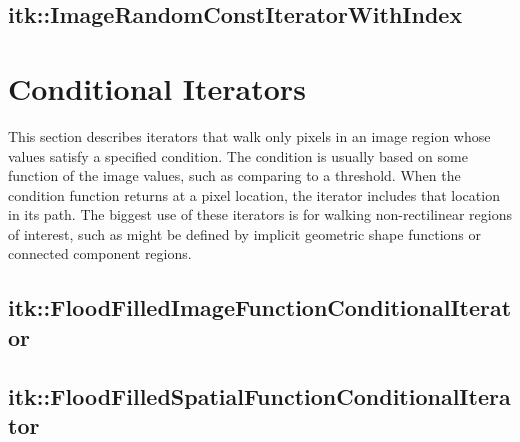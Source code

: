 \subsection{itk::ImageRandomConstIteratorWithIndex}
\label{sec:itkImageRandomConstIteratorWithIndex}



\section{Conditional Iterators}
\label{sec:ConditionalIterators}
This section describes iterators that walk only pixels in an image region whose
values satisfy a specified condition.  The condition is usually based on some
function of the image values, such as comparing to a threshold.  When the
condition function returns  at a pixel location, the iterator
includes that location in its path.  The biggest use of these iterators is for
walking non-rectilinear regions of interest, such as might be defined by
implicit geometric shape functions or connected component regions.


%

\subsection{itk::FloodFilledImageFunctionConditionalIterator}
\label{itk::FloodFilledImageFunctionConditionalIterator}


\subsection{itk::FloodFilledSpatialFunctionConditionalIterator}
\label{itk::FloodFilledSpatialFunctionConditionalIterator}


